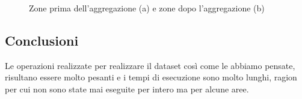 \begin{figure}[bth]
\myfloatalign
{} \quad
{} 
\caption[]{Zone prima dell'aggregazione (a) e zone dopo l'aggregazione (b)}\label{fig:zoneAggregateBordo}
\end{figure}

\newpage
\subsection{Conclusioni}
Le operazioni realizzate per realizzare il dataset così come le abbiamo pensate, risultano essere molto pesanti e i tempi di esecuzione sono molto lunghi, ragion per cui non sono state mai eseguite per intero ma per alcune aree. 
